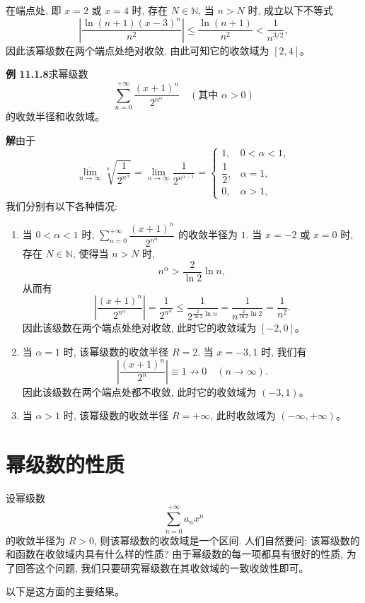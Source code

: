 \documentclass[UTF8,12pt,a4paper,fontset=fandol]{ctexart}
\begin{document}
在端点处, 即 $x=2$ 或 $x=4$ 时, 存在 $N\in\mathbb N$, 当 $n>N$ 时, 成立以下不等式
\[
  \left|\frac{\ln(n+1)(x-3)^n}{n^2}\right|
  \leqslant
  \frac{\ln(n+1)}{n^2}
  <
  \frac1{n^{3/2}},
\]
因此该幂级数在两个端点处绝对收敛. 由此可知它的收敛域为 $[2,4]$。

\noindent\textbf{例 11.1.8}\quad 求幂级数
\[
  \sum_{n=0}^{+\infty}\frac{(x+1)^n}{2^{n^\alpha}}
  \quad(\text{其中 }\alpha>0)
\]
的收敛半径和收敛域。

\noindent\textbf{解}\quad 由于
\[
  \overline{\lim_{n\to\infty}}\sqrt[n]{\frac1{2^{n^\alpha}}}
  =
  \lim_{n\to\infty}\frac1{2^{n^{\alpha-1}}}
  =
  \begin{cases}
    1, &0<\alpha<1,\\
    \dfrac12, &\alpha=1,\\
    0, &\alpha>1,
  \end{cases}
\]
我们分别有以下各种情况:
\begin{enumerate}
  \item 当 $0<\alpha<1$ 时, $\sum_{n=0}^{+\infty}\dfrac{(x+1)^n}{2^{n^\alpha}}$ 的收敛半径为 $1$. 当 $x=-2$ 或 $x=0$ 时, 存在 $N\in\mathbb N$, 使得当 $n>N$ 时,
  \[
    n^\alpha>\frac2{\ln2}\ln n,
  \]
  从而有
  \[
    \left|\frac{(x+1)^n}{2^{n^\alpha}}\right|
    =
    \frac1{2^{n^\alpha}}
    \leqslant
    \frac1{2^{\frac2{\ln2}\ln n}}
    =
    \frac1{n^{\frac2{\ln2}\ln2}}
    =
    \frac1{n^2}.
  \]
  因此该级数在两个端点处绝对收敛, 此时它的收敛域为 $[-2,0]$。

  \item 当 $\alpha=1$ 时, 该幂级数的收敛半径 $R=2$. 当 $x=-3,1$ 时, 我们有
  \[
    \left|\frac{(x+1)^n}{2^n}\right|\equiv1\nrightarrow0\quad(n\to\infty).
  \]
  因此该级数在两个端点处都不收敛, 此时它的收敛域为 $(-3,1)$。

  \item 当 $\alpha>1$ 时, 该幂级数的收敛半径 $R=+\infty$, 此时收敛域为 $(-\infty,+\infty)$。
\end{enumerate}

\section{幂级数的性质}

设幂级数
\[
  \sum_{n=0}^{+\infty}a_nx^n
\]
的收敛半径为 $R>0$, 则该幂级数的收敛域是一个区间. 人们自然要问: 该幂级数的和函数在收敛域内具有什么样的性质? 由于幂级数的每一项都具有很好的性质, 为了回答这个问题, 我们只要研究幂级数在其收敛域的一致收敛性即可。

以下是这方面的主要结果。
\end{document}
